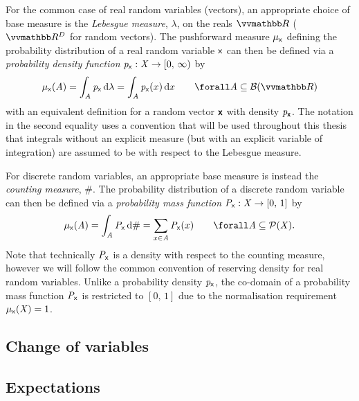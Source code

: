 For the common case of real random variables (vectors), an appropriate choice of base measure is the \emph{Lebesgue measure}, $\lambda$, on the reals $\reals$ ($\reals^D$ for random vectors). The pushforward measure $\mu_{\mathsf{x}}$ defining the probability distribution of a real random variable $\mathsf{x}$ can then be defined via a \emph{probability density function} $\mathit{p}_{\mathsf{x}} : \mathit{X} \to [0,\,\infty)$ by
\begin{equation}\label{eq:real-rv-prob-dens}
    \mu_{\rvar{x}}(\set{A})
    = \int_{\set{A}} \pdennoarg{\rvar{x}} \,\dr\lambda
    = \int_{\set{A}} \pden{\rvar{x}}{x} \,\dr x
    \qquad
    \forall \set{A} \subseteq \sset{B}(\reals)
\end{equation}
with an equivalent definition for a random vector $\boldsymbol{\mathsf{x}}$ with density $\mathit{p}_{\boldsymbol{\mathsf{x}}}$. The notation in the second equality uses a convention that will be used throughout this thesis that integrals without an explicit measure (but with an explicit variable of integration) are assumed to be with respect to the Lebesgue measure.

For discrete random variables, an appropriate base measure is instead the \emph{counting measure}, $\#$.  The probability distribution of a discrete random variable can then be defined via a \emph{probability mass function} $\mathit{P}_{\mathsf{x}} : \mathit{X} \to [0,\,1]$ by
\begin{equation}
    \mu_{\rvar{x}}(\set{A})
    = \int_{\set{A}} \probnoarg{\rvar{x}} \,\dr\#
    = \sum_{x \in \set{A}} \prob{\rvar{x}}{x} 
    \qquad
    \forall \set{A} \subseteq \sset{P}(\set{X}).
\end{equation}
Note that technically $\mathit{P}_{\mathsf{x}}$ is a density with respect to the counting measure, however we will follow the common convention of reserving density for real random variables. Unlike a probability density $\mathit{p}_{\mathsf{x}}$, the co-domain of a probability mass function $\mathit{P}_{\mathsf{x}}$ is restricted to $[0,\,1]$ due to the normalisation requirement $\mu_{\mathsf{x}}(\mathit{X}) = 1$. 

\subsection{Change of variables}

\subsection{Expectations}

